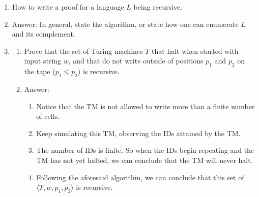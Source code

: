 \documentclass[10pt]{article}
\begin{document}
\begin{enumerate}
  
%
%
%
%
%  
  
\item How to write a proof for a language $L$ being recursive.
\item[] {\sf Answer: In general, state the algorithm, or state how one can
  enumerate $L$ and its complement.}

\item  
  \begin{enumerate}
  \item Prove that the set of Turing  machines $T$ that halt when
    started with input string $w$, and
    that do not write outside of positions $p_1$
    and $p_2$ on the tape ($p_1\leq p_2$) is recursive.
  \item[]
    \begin{sf}
      Answer:
    \begin{enumerate}
    \item Notice that the TM is not allowed to write more than
      a finite number of cells.
    \item Keep simulating this TM, observing the IDs attained
      by the TM.
    \item The number of IDs is finite. So when the IDs begin repeating
      and the TM has not yet halted, we can conclude that the
      TM will never halt.
    \item Following the aforesaid algorithm, we can conclude
      that this set of $\langle T,w,p_1,p_2\rangle$ is recursive.
    \end{enumerate}
    \end{sf}
    

\end{enumerate}
\end{enumerate}
\end{document}
